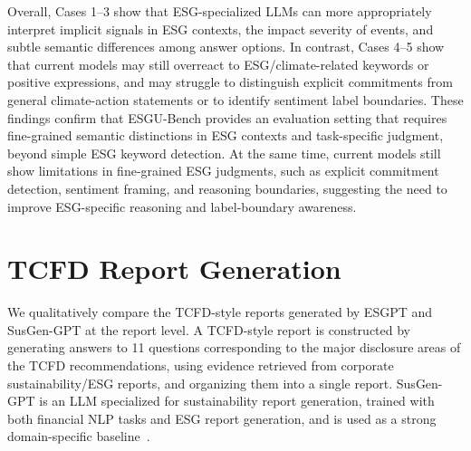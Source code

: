 \documentclass[11pt]{article}
\begin{document}
Overall, Cases 1--3 show that ESG-specialized LLMs can more appropriately interpret implicit signals in ESG contexts, the impact severity of events, and subtle semantic differences among answer options. In contrast, Cases 4--5 show that current models may still overreact to ESG/climate-related keywords or positive expressions, and may struggle to distinguish explicit commitments from general climate-action statements or to identify sentiment label boundaries. These findings confirm that \textsf{ESGU-Bench} provides an evaluation setting that requires fine-grained semantic distinctions in ESG contexts and task-specific judgment, beyond simple ESG keyword detection. At the same time, current models still show limitations in fine-grained ESG judgments, such as explicit commitment detection, sentiment framing, and reasoning boundaries, suggesting the need to improve ESG-specific reasoning and label-boundary awareness.



\section{TCFD Report Generation}
\label{app:report_generation}
We qualitatively compare the TCFD-style reports generated by \textsf{ESGPT} and SusGen-GPT at the report level. A TCFD-style report is constructed by generating answers to 11 questions corresponding to the major disclosure areas of the TCFD recommendations, using evidence retrieved from corporate sustainability/ESG reports, and organizing them into a single report. SusGen-GPT is an LLM specialized for sustainability report generation, trained with both financial NLP tasks and ESG report generation, and is used as a strong domain-specific baseline~\cite{wu2025susgen}.
\end{document}

